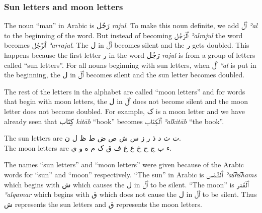 \documentclass[
  10pt,
]{book}
\begin{document}
\subsubsection{Sun letters and moon letters}\label{sun-letters-and-moon-letters}

The noun \enquote{man} in Arabic is \foreignlanguage{arabic}{رَجُل} \emph{rajul}. To make this noun definite, we add \foreignlanguage{arabic}{ٱَلْ} \emph{ʾal} to the beginning of the word. But instead of becoming \foreignlanguage{arabic}{ٱَلْرَجُل} \emph{ʾalrajul} the word becomes \foreignlanguage{arabic}{ٱَلرَّجُل} \emph{ʾarrajul}. The \foreignlanguage{arabic}{ل} in \foreignlanguage{arabic}{ٱَلْ} becomes silent and the \foreignlanguage{arabic}{ر} gets doubled. This happens because the first letter \foreignlanguage{arabic}{ر} in the word \foreignlanguage{arabic}{رَجُل} \emph{rajul} is from a group of letters called \enquote{sun letters}. For all nouns beginning with sun letters, when \foreignlanguage{arabic}{ٱَلْ} \emph{ʾal} is put in the beginning, the \foreignlanguage{arabic}{ل} in \foreignlanguage{arabic}{ٱَلْ} becomes silent and the sun letter becomes doubled.

The rest of the letters in the alphabet are called \enquote{moon letters} and for words that begin with moon letters, the \foreignlanguage{arabic}{ل} in \foreignlanguage{arabic}{ٱَلْ} does not become silent and the moon letter does not become doubled. For example, \foreignlanguage{arabic}{ک} is a moon letter and we have already seen that \foreignlanguage{arabic}{کِتَاب} \emph{kitāb} \enquote{book} becomes \foreignlanguage{arabic}{ٱَلْکِتَاب} \emph{ʾalkitāb} \enquote{the book}.

The sun letters are \foreignlanguage{arabic}{ت ث د ذ ر ز س ش ص ض ط ظ ل ن}.\\
The moon letters are \foreignlanguage{arabic}{ء ب ج ح خ ع غ ف ق ک م ه و ي}.

The names \enquote{sun letters} and \enquote{moon letters} were given because of the Arabic words for \enquote{sun} and \enquote{moon} respectively. \enquote{The sun} in Arabic is \foreignlanguage{arabic}{ٱَلشَّمْس} \emph{ʾas͡hs͡hams} which begins with \foreignlanguage{arabic}{ش} which causes the \foreignlanguage{arabic}{ل} in \foreignlanguage{arabic}{ٱَلْ} to be silent. \enquote{The moon} is \foreignlanguage{arabic}{ٱَلْقَمَر} \emph{ʾalqamar} which begins with \foreignlanguage{arabic}{ق} which does not cause the \foreignlanguage{arabic}{ل} in \foreignlanguage{arabic}{ٱَلْ} to be silent. Thus \foreignlanguage{arabic}{ش} represents the sun letters and \foreignlanguage{arabic}{ق} represents the moon letters.
\end{document}
